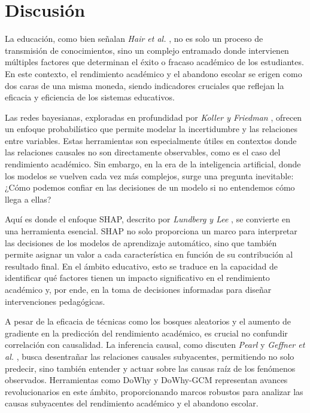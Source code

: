 \hypertarget{discusiuxf3n}{%
\section{Discusión}\label{discusiuxf3n}}

La educación, como bien señalan \textit{Hair et al.} \cite{hair2019advanced}, no es solo un proceso de transmisión de conocimientos, sino un complejo entramado donde intervienen múltiples factores que determinan el éxito o fracaso académico de los estudiantes. En este contexto, el rendimiento académico y el abandono escolar se erigen como dos caras de una misma moneda, siendo indicadores cruciales que reflejan la eficacia y eficiencia de los sistemas educativos.

Las redes bayesianas, exploradas en profundidad por \textit{Koller y Friedman} \cite{koller2009introduction}, ofrecen un enfoque probabilístico que permite modelar la incertidumbre y las relaciones entre variables. Estas herramientas son especialmente útiles en contextos donde las relaciones causales no son directamente observables, como es el caso del rendimiento académico. Sin embargo, en la era de la inteligencia artificial, donde los modelos se vuelven cada vez más complejos, surge una pregunta inevitable: ¿Cómo podemos confiar en las decisiones de un modelo si no entendemos cómo llega a ellas?

Aquí es donde el enfoque SHAP, descrito por \textit{Lundberg y Lee} \cite{lundberg2017unified}, se convierte en una herramienta esencial. SHAP no solo proporciona un marco para interpretar las decisiones de los modelos de aprendizaje automático, sino que también permite asignar un valor a cada característica en función de su contribución al resultado final. En el ámbito educativo, esto se traduce en la capacidad de identificar qué factores tienen un impacto significativo en el rendimiento académico y, por ende, en la toma de decisiones informadas para diseñar intervenciones pedagógicas.

A pesar de la eficacia de técnicas como los bosques aleatorios \cite{breiman2001random} y el aumento de gradiente \cite{friedman2000additive} en la predicción del rendimiento académico, es crucial no confundir correlación con causalidad. La inferencia causal, como discuten \textit{Pearl} \cite{pearl2009introduction} y \textit{Geffner et al.} \cite{geffner2022deep}, busca desentrañar las relaciones causales subyacentes, permitiendo no solo predecir, sino también entender y actuar sobre las causas raíz de los fenómenos observados. Herramientas como DoWhy \cite{sharma2020dowhy} y DoWhy-GCM \cite{blobaum2022dowhy} representan avances revolucionarios en este ámbito, proporcionando marcos robustos para analizar las causas subyacentes del rendimiento académico y el abandono escolar.

